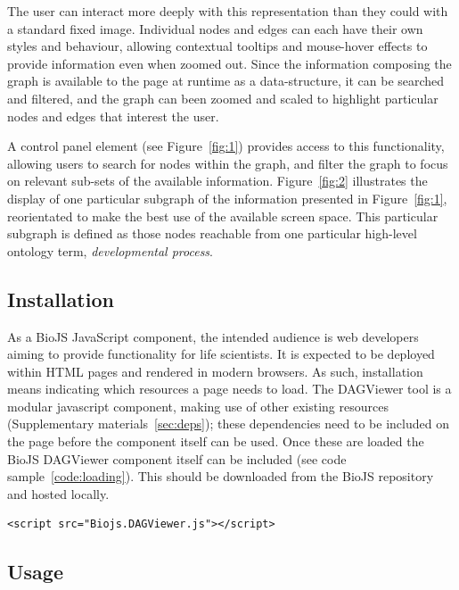 \documentclass[10pt,a4paper,twocolumn]{article}
\begin{document}
The user can interact more deeply with this representation than they could with
a standard fixed image. Individual nodes and edges can each have their own
styles and behaviour, allowing contextual tooltips and mouse-hover effects to
provide information even when zoomed out. Since the information composing the
graph is available to the page at runtime as a data-structure, it can be
searched and filtered, and the graph can been zoomed and scaled to highlight
particular nodes and edges that interest the user.

A control panel element (see Figure~\ref{fig:1}) provides access to this
functionality, allowing users to search for nodes within the graph, and filter
the graph to focus on relevant sub-sets of the available information.
Figure~\ref{fig:2} illustrates the display of one particular subgraph of the
information presented in Figure~\ref{fig:1}, reorientated to make the best use
of the available screen space. This particular subgraph is defined as those
nodes reachable from one particular high-level ontology term,
\emph{developmental process}.

\subsection*{Installation}

As a BioJS JavaScript component, the intended audience is web developers aiming
to provide functionality for life scientists. It is expected to be deployed
within HTML pages and rendered in modern browsers. As such,
installation means indicating which resources a page needs to load.  The
DAGViewer tool is a modular javascript component, making use of other existing
resources (Supplementary materials~\ref{sec:deps}); these dependencies need to be
included on the page before the component itself can be used.  Once these are
loaded the BioJS DAGViewer component itself can be included (see code
sample~\ref{code:loading}).  This should be downloaded from the BioJS
repository~\cite{site:biojs-registry} and hosted locally.

\begin{lstlisting}[caption={Loading the DAG-Viewer Library}, label={code:loading}]
<script src="Biojs.DAGViewer.js"></script>
\end{lstlisting}

\subsection*{Usage}
\end{document}
